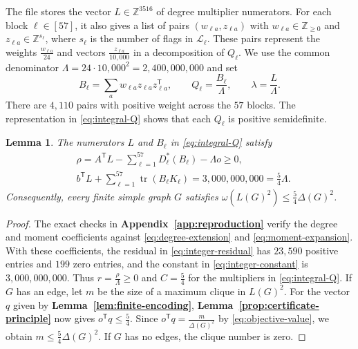 \documentclass[preprint,11pt,numbers]{elsarticle-arxiv}
\numberwithin{equation}{section}
\newtheorem{lemma}[theorem]{Lemma}
\theoremstyle{definition}
\DeclareMathOperator{\tr}{tr}
\begin{document}
The file  stores
the vector $L\in\mathbb Z^{3516}$ of degree multiplier numerators.
For each block $\ell\in[57]$, it also gives a list of pairs
$(w_{\ell a},z_{\ell a})$ with $w_{\ell a}\in\mathbb Z_{\geq0}$ and
$z_{\ell a}\in\mathbb Z^{s_\ell}$, where $s_\ell$ is the number of
flags in $\mathcal L_\ell$. These pairs represent the weights
$\frac{w_{\ell a}}{24}$ and vectors $\frac{z_{\ell a}}{10{,}000}$
in a decomposition of $Q_\ell$. We use the common
denominator $\Lambda=24\cdot10{,}000^2=2{,}400{,}000{,}000$ and set
\begin{equation}\label{eq:integral-Q}
 B_\ell=\sum_a w_{\ell a}z_{\ell a}z_{\ell a}^{\mathsf T},
 \qquad Q_\ell=\frac{B_\ell}{\Lambda},
 \qquad \lambda=\frac{L}{\Lambda}.
\end{equation}
There are $4{,}110$ pairs with positive weight across the $57$ blocks.
The representation in \eqref{eq:integral-Q} shows that each $Q_\ell$
is positive semidefinite.

\begin{lemma}\label{prop:checked-certificate}\label{prop:quadratic-bound}\label{lem:rational-witness}
The numerators $L$ and $B_\ell$ in \eqref{eq:integral-Q} satisfy
\begin{align}
 &\rho=A^{\mathsf T}L-\sum_{\ell=1}^{57}D_\ell^*(B_\ell)
                  -\Lambda o\geq0,\label{eq:integer-residual}\\
 &b^{\mathsf T}L+\sum_{\ell=1}^{57}\tr(B_\ell K_\ell)
     =3{,}000{,}000{,}000=\frac{5}{4}\Lambda.
       \label{eq:integer-constant}
\end{align}
Consequently, every finite simple graph $G$ satisfies
$\omega(L(G)^2)\leq\frac{5}{4}\Delta(G)^2$.
\end{lemma}

\begin{proof}
The exact checks in \textbf{Appendix~\ref{app:reproduction}} verify the
degree and moment coefficients against \eqref{eq:degree-extension}
and \eqref{eq:moment-expansion}. With these coefficients, the
residual in \eqref{eq:integer-residual} has $23{,}590$ positive entries
and $199$ zero entries, and the constant in \eqref{eq:integer-constant}
is $3{,}000{,}000{,}000$. Thus $r=\frac{\rho}{\Lambda}\geq0$ and
$C=\frac{5}{4}$ for the multipliers in \eqref{eq:integral-Q}.
If $G$ has an edge, let $m$ be the size of a maximum clique in $L(G)^2$.
For the vector $q$ given by \textbf{Lemma~\ref{lem:finite-encoding}},
\textbf{Lemma~\ref{prop:certificate-principle}} now gives
$o^{\mathsf T}q\leq\frac{5}{4}$.
Since $o^{\mathsf T}q=\frac{m}{\Delta(G)^2}$ by \eqref{eq:objective-value},
we obtain $m\leq\frac{5}{4}\Delta(G)^2$.
If $G$ has no edges, the clique number is zero.
\end{proof}
\end{document}
